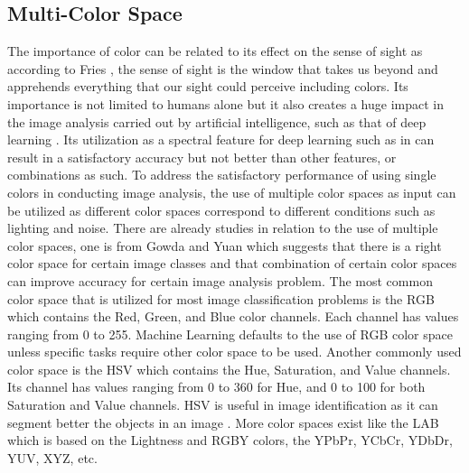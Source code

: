 \subsection{Multi-Color Space}
The importance of color can be related to its effect on the sense of sight as according to Fries \cite{grusser-1989}, the sense of sight is the window that takes us beyond and apprehends everything that our sight could perceive including colors. Its importance is not limited to humans alone but it also creates a huge impact in the image analysis carried out by artificial intelligence, such as that of deep learning \cite{larbi-2018,he-2019,hirota-2020}. Its utilization as a spectral feature for deep learning such as in \cite{al-sarayreh-2018} can result in a satisfactory accuracy but not better than other features, or combinations as such. To address the satisfactory performance of using single colors in conducting image analysis, the use of multiple color spaces as input can be utilized as different color spaces correspond to different conditions such as lighting and noise. There are already studies in relation to the use of multiple color spaces, one is from Gowda and Yuan \cite{gowda-2019} which suggests that there is a right color space for certain image classes and that combination of certain color spaces can improve accuracy for certain image analysis problem. The most common color space that is utilized for most image classification problems is the RGB which contains the Red, Green, and Blue color channels. Each channel has values ranging from 0 to 255. Machine Learning defaults to the use of RGB color space unless specific tasks require other color space to be used.  Another commonly used color space is the HSV which contains the Hue, Saturation, and Value channels. Its channel has values ranging from 0 to 360 for Hue, and 0 to 100 for both Saturation and Value channels. HSV is useful in image identification as it can segment better the objects in an image \cite{sural-2003}. More color spaces exist like the LAB which is based on the Lightness and RGBY colors, the YPbPr, YCbCr, YDbDr, YUV, XYZ, etc.